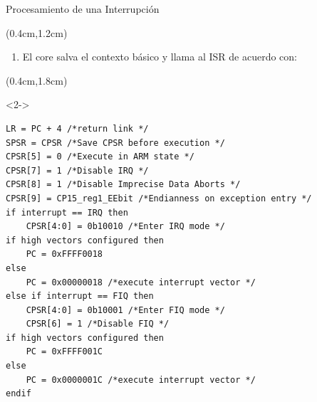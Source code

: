 \documentclass[usenames,table,xcolor={x11names},aspectratio=169]{beamer}
\newcounter{saveenumi}
\newcommand{\seti}{\setcounter{saveenumi}{\value{enumi}}}
\newcommand{\conti}{\setcounter{enumi}{\value{saveenumi}}}
\begin{document}
\begin{frame}[t,fragile]{Procesamiento de una Interrupción}
 \begin{textblock*}{\textwidth}(0.4cm,1.2cm)
  \begin{enumerate}[<+->]\justifying 
    \conti
   \item El core salva el contexto básico y llama al ISR de acuerdo con:
    \seti
  \end{enumerate}
 \end{textblock*}
 \begin{textblock*}{\textwidth}(0.4cm,1.8cm)
  \begin{onlyenv}<2->
   \begin{lstlisting}[basicstyle=\scriptsize,escapechar=\@,numbers=none, frame=single, xleftmargin=20pt, xrightmargin=0pt,]
LR = PC + 4 /*return link */
SPSR = CPSR /*Save CPSR before execution */
CPSR[5] = 0 /*Execute in ARM state */
CPSR[7] = 1 /*Disable IRQ */
CPSR[8] = 1 /*Disable Imprecise Data Aborts */
CPSR[9] = CP15_reg1_EEbit /*Endianness on exception entry */
if interrupt == IRQ then 
    CPSR[4:0] = 0b10010 /*Enter IRQ mode */
if high vectors configured then 
    PC = 0xFFFF0018
else
    PC = 0x00000018 /*execute interrupt vector */
else if interrupt == FIQ then
    CPSR[4:0] = 0b10001 /*Enter FIQ mode */
    CPSR[6] = 1 /*Disable FIQ */
if high vectors configured then
    PC = 0xFFFF001C
else
    PC = 0x0000001C /*execute interrupt vector */
endif
   \end{lstlisting}
  \end{onlyenv}
 \end{textblock*}
\end{frame}
  
\end{document}
